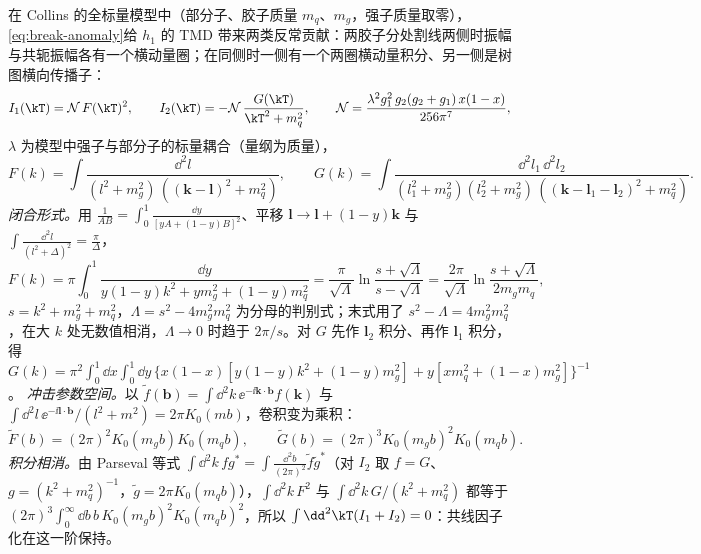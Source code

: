 \begin{example}\label{ex:break-c07}
在 Collins 的全标量模型中（部分子、胶子质量 $m_q$、$m_g$，强子质量取零），\cref{eq:break-anomaly}给 $h_1$ 的 TMD 带来两类反常贡献：两胶子分处割线两侧时振幅与共轭振幅各有一个横动量圈；在同侧时一侧有一个两圈横动量积分、另一侧是树图横向传播子\cite[式~(10)(11)]{Collins2007}：
\begin{equation}\label{eq:break-I12}
I_1(\kT)=\mathcal N\,F(\kT)^2,\qquad I_2(\kT)=-\mathcal N\,\frac{G(\kT)}{\kT^2+m_q^2},\qquad \mathcal N=\frac{\lambda^2g_1^2\,g_2(g_2+g_1)\,x(1-x)}{256\pi^7},
\end{equation}
$\lambda$ 为模型中强子与部分子的标量耦合（量纲为质量），
\begin{equation}\label{eq:break-FG}
F(k)=\int\frac{\dd^2l}{(l^2+m_g^2)\,((\boldsymbol k-\boldsymbol l)^2+m_q^2)},\qquad
G(k)=\int\frac{\dd^2l_1\,\dd^2l_2}{(l_1^2+m_g^2)(l_2^2+m_g^2)\,((\boldsymbol k-\boldsymbol l_1-\boldsymbol l_2)^2+m_q^2)} .
\end{equation}
\emph{闭合形式。}用 $\frac1{AB}=\int_0^1\frac{\dd y}{[yA+(1-y)B]^2}$、平移 $\boldsymbol l\to\boldsymbol l+(1-y)\boldsymbol k$ 与 $\int\frac{\dd^2l}{(l^2+\Delta)^2}=\frac\pi\Delta$，
\begin{equation}\label{eq:break-F-closed}
F(k)=\pi\int_0^1\frac{\dd y}{y(1-y)k^2+ym_g^2+(1-y)m_q^2}=\frac{\pi}{\sqrt\Lambda}\ln\frac{s+\sqrt\Lambda}{s-\sqrt\Lambda}=\frac{2\pi}{\sqrt\Lambda}\ln\frac{s+\sqrt\Lambda}{2m_gm_q},
\end{equation}
$s=k^2+m_g^2+m_q^2$，$\Lambda=s^2-4m_g^2m_q^2$ 为分母的判别式；末式用了 $s^2-\Lambda=4m_g^2m_q^2$，在大 $k$ 处无数值相消，$\Lambda\to0$ 时趋于 $2\pi/s$。对 $G$ 先作 $\boldsymbol l_2$ 积分、再作 $\boldsymbol l_1$ 积分，得 $G(k)=\pi^2\int_0^1\!\dd x\int_0^1\!\dd y\,\{x(1-x)[y(1-y)k^2+(1-y)m_g^2]+y[xm_q^2+(1-x)m_g^2]\}^{-1}$。
\emph{冲击参数空间。}以 $\tilde f(\boldsymbol b)=\int\dd^2k\,\ee^{-\ii\boldsymbol k\cdot\boldsymbol b}f(\boldsymbol k)$ 与 $\int\dd^2l\,\ee^{-\ii\boldsymbol l\cdot\boldsymbol b}/(l^2+m^2)=2\pi K_0(mb)$，卷积变为乘积：
\begin{equation}\label{eq:break-FG-b}
\tilde F(b)=(2\pi)^2K_0(m_gb)K_0(m_qb),\qquad \tilde G(b)=(2\pi)^3K_0(m_gb)^2K_0(m_qb).
\end{equation}
\emph{积分相消。}由 Parseval 等式 $\int\dd^2k\,fg^*=\int\frac{\dd^2b}{(2\pi)^2}\tilde f\tilde g^*$（对 $I_2$ 取 $f=G$、$g=(k^2+m_q^2)^{-1}$，$\tilde g=2\pi K_0(m_qb)$），$\int\dd^2k\,F^2$ 与 $\int\dd^2k\,G/(k^2+m_q^2)$ 都等于 $(2\pi)^3\int_0^\infty\dd b\,b\,K_0(m_gb)^2K_0(m_qb)^2$，所以 $\int\dd^2\kT(I_1+I_2)=0$：共线因子化在这一阶保持。

\end{example}
